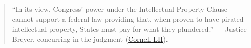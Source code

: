 \documentclass[12pt]{article}
\begin{document}
\begin{quote}
``In its view, Congress' power under the Intellectual Property Clause cannot support a federal law providing that, when proven to have pirated intellectual property, States must pay for what they plundered.'' --- Justice Breyer, concurring in the judgment (\href{https://www.law.cornell.edu/supremecourt/text/18-877}{Cornell LII}).
\end{quote}
\end{document}
